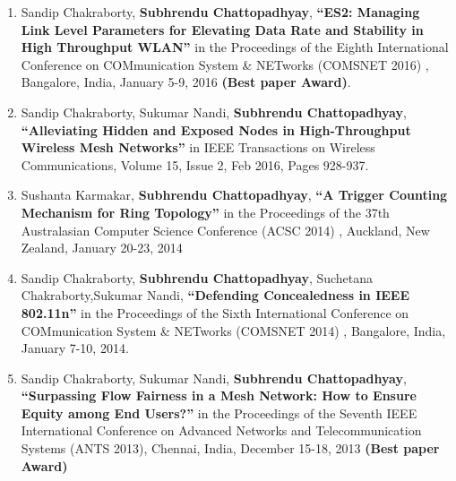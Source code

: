 \documentclass{res}
\newcommand{\papertitle}[1]{\textbf{ ``#1''}}
\begin{document}
\begin{resume}
\begin{enumerate}
		\item Sandip Chakraborty, {\bf Subhrendu Chattopadhyay}, \papertitle{ES2: Managing Link Level Parameters for Elevating Data Rate and Stability in High Throughput WLAN} in the Proceedings of the Eighth International Conference on COMmunication System \& NETworks {(COMSNET 2016)} , Bangalore, India, January 5-9, 2016 {\bf (Best paper Award)}.
		\item Sandip Chakraborty, Sukumar Nandi, {\bf Subhrendu Chattopadhyay}, \papertitle{Alleviating Hidden and Exposed Nodes in High-Throughput Wireless Mesh Networks} in IEEE Transactions on Wireless Communications, Volume 15, Issue 2, Feb 2016, Pages 928-937.
		\item Sushanta Karmakar, {\bf Subhrendu Chattopadhyay},  \papertitle{A Trigger Counting Mechanism for Ring Topology}  in the Proceedings of the 37th Australasian Computer Science Conference (ACSC 2014) , Auckland, New Zealand, January 20-23, 2014
		\item Sandip Chakraborty, {\bf Subhrendu Chattopadhyay}, Suchetana Chakraborty,Sukumar Nandi,  \papertitle{Defending Concealedness in IEEE 802.11n}  in the Proceedings of the Sixth International Conference on COMmunication System \& NETworks (COMSNET 2014) , Bangalore, India, January 7-10, 2014.
		\item Sandip Chakraborty, Sukumar Nandi, {\bf Subhrendu Chattopadhyay}, \papertitle{Surpassing Flow Fairness in a Mesh Network: How to Ensure Equity among End Users?}  in the Proceedings of the Seventh IEEE International Conference on Advanced Networks and Telecommunication Systems (ANTS 2013), Chennai, India, December 15-18, 2013 {\bf (Best paper Award)} 
	\end{enumerate}        
\end{resume}
\end{document}
